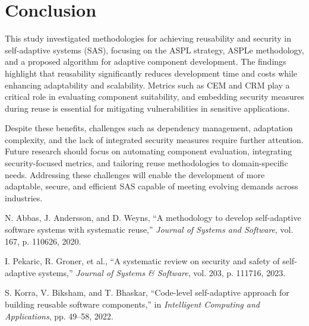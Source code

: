 \documentclass[a4paper,10pt]{article}
\begin{document}
\section{Conclusion}

This study investigated methodologies for achieving reusability and security in self-adaptive systems (SAS), focusing on the ASPL strategy, ASPLe methodology, and a proposed algorithm for adaptive component development. The findings highlight that reusability significantly reduces development time and costs while enhancing adaptability and scalability. Metrics such as CEM and CRM play a critical role in evaluating component suitability, and embedding security measures during reuse is essential for mitigating vulnerabilities in sensitive applications.

Despite these benefits, challenges such as dependency management, adaptation complexity, and the lack of integrated security measures require further attention. Future research should focus on automating component evaluation, integrating security-focused metrics, and tailoring reuse methodologies to domain-specific needs. Addressing these challenges will enable the development of more adaptable, secure, and efficient SAS capable of meeting evolving demands across industries.


\begin{thebibliography}{9}


N. Abbas, J. Andersson, and D. Weyns, ``A methodology to develop self-adaptive software systems with systematic reuse,'' \emph{Journal of Systems and Software}, vol. 167, p. 110626, 2020.

I. Pekaric, R. Groner, et al., ``A systematic review on security and safety of self-adaptive systems,'' \emph{Journal of Systems \& Software}, vol. 203, p. 111716, 2023.

S. Korra, V. Biksham, and T. Bhaskar, ``Code-level self-adaptive approach for building reusable software components,'' in \emph{Intelligent Computing and Applications}, pp. 49--58, 2022.
\end{thebibliography}
\end{document}
